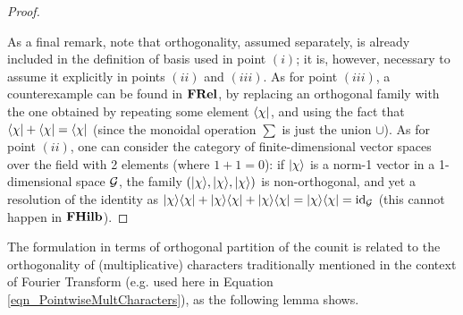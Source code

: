 \begin{proof}
\begin{itemize}
\end{itemize}

As a final remark, note that orthogonality, assumed separately, is already included in the definition of basis used in point $(i)$; it is, however, necessary to assume it explicitly in points $(ii)$ and $(iii)$. As for point $(iii)$, a counterexample can be found in $\mathbf{FRel}$, by replacing an orthogonal family with the one obtained by repeating some element $\langle \chi |$, and using the fact that $\langle \chi | + \langle \chi | = \langle \chi |$ (since the monoidal operation $\sum$ is just the union $\cup$). As for point $(ii)$, one can consider the category of finite-dimensional vector spaces over the field with 2 elements (where $1+1=0$): if $| \chi \rangle$ is a norm-1 vector in a 1-dimensional space $\mathcal{G}$, the family $(| \chi \rangle,| \chi \rangle,| \chi \rangle)$ is non-orthogonal, and yet a resolution of the identity as $| \chi \rangle\langle \chi |+| \chi \rangle\langle \chi |+| \chi \rangle\langle \chi | = | \chi \rangle\langle \chi | = \mbox{id}_{\mathcal{G}}$ (this cannot happen in $\mathbf{FHilb}$).
\end{proof}

The formulation in terms of orthogonal partition of the counit is related to the orthogonality of (multiplicative) characters traditionally mentioned in the context of Fourier Transform (e.g. used here in Equation \ref{eqn_PointwiseMultCharacters}), as the following lemma shows. 

